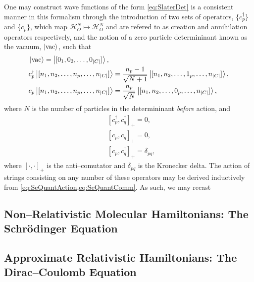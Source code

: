 One may construct wave functions of the form \cref{eq:SlaterDet} is a consistent manner in this formalism through
the introduction of two sets of operators, $\{ c_p^\dagger \}$ and $\{ c_p \}$, which map $\mathcal{H}^N_O \mapsto \mathcal{H}^N_O$ 
and are refered to as creation and annihilation operators respectively, and the notion of a zero particle determininant known as 
the vacuum, $\left\vert \mathrm{vac} \right\rangle$, such that
\begin{subequations}
  \label{eq:SeQuantAction}
\begin{align}
  &\left\vert \mathrm{vac} \right\rangle = \left\vert [0_1, 0_2, \ldots, 0_{\vert C \vert}] \right\rangle, \\
  &c_p^\dagger \left\vert [n_1, n_2, \ldots, n_p, \ldots, n_{\vert C \vert}] \right\rangle = \frac{n_p-1}{\sqrt{N+1}} \left\vert [n_1, n_2, \ldots, 1_p, \ldots, n_{\vert C \vert}] \right\rangle,\\
  &c_p \left\vert [n_1, n_2, \ldots, n_p, \ldots, n_{\vert C \vert}] \right\rangle = \frac{n_p}{\sqrt{N}} \left\vert [n_1, n_2, \ldots, 0_p, \ldots, n_{\vert C \vert}] \right\rangle,
\end{align}
\end{subequations}
where $N$ is the number of particles in the determininant \emph{before} action, and
\begin{subequations}
  \label{eq:SeQuantComm}
\begin{align}
  &[c_p^\dagger, c_q^\dagger]_+ = 0,\\
  &[c_p, c_q]_+ = 0,\\
  &[c_p, c_q^\dagger]_+ = \delta_{pq},
\end{align}
\end{subequations}
where $[\cdot,\cdot]_+$ is the anti--comutator and $\delta_{pq}$ is the Kronecker delta. The action of strings consisting on any number of these 
operators may be derived inductively from \cref{eq:SeQuantAction,eq:SeQuantComm}. As such, we may recast

\subsection{Non--Relativistic Molecular Hamiltonians: The Schr\"{o}dinger Equation}
\label{sec:NRH}

\subsection{Approximate Relativistic Hamiltonians: The Dirac--Coulomb Equation}
\label{sec:RELH}



